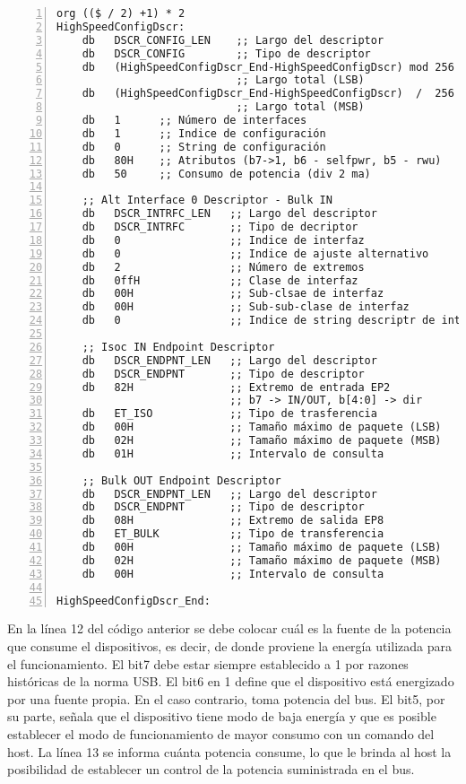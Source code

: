 	\begin{lstlisting}[language={[x86masm]Assembler},backgroundcolor=\color{gray!30},numbers=left]
org (($ / 2) +1) * 2
HighSpeedConfigDscr:
	db   DSCR_CONFIG_LEN	;; Largo del descriptor
	db   DSCR_CONFIG        ;; Tipo de descriptor
	db   (HighSpeedConfigDscr_End-HighSpeedConfigDscr) mod 256
							;; Largo total (LSB)
	db   (HighSpeedConfigDscr_End-HighSpeedConfigDscr)  /  256 
							;; Largo total (MSB)
	db   1      ;; Número de interfaces
	db   1      ;; Indice de configuración
	db   0		;; String de configuración
	db   80H	;; Atributos (b7->1, b6 - selfpwr, b5 - rwu)
	db   50		;; Consumo de potencia (div 2 ma)
	
	;; Alt Interface 0 Descriptor - Bulk IN
	db   DSCR_INTRFC_LEN   ;; Largo del descriptor
	db   DSCR_INTRFC       ;; Tipo de decriptor
	db   0                 ;; Indice de interfaz
	db   0                 ;; Indice de ajuste alternativo
	db   2                 ;; Número de extremos
	db   0ffH              ;; Clase de interfaz
	db   00H               ;; Sub-clsae de interfaz
	db   00H               ;; Sub-sub-clase de interfaz
	db   0                 ;; Indice de string descriptr de interfaz
	
	;; Isoc IN Endpoint Descriptor 
	db   DSCR_ENDPNT_LEN   ;; Largo del descriptor
	db   DSCR_ENDPNT       ;; Tipo de descriptor
	db   82H               ;; Extremo de entrada EP2
						   ;; b7 -> IN/OUT, b[4:0] -> dir
	db   ET_ISO            ;; Tipo de trasferencia
	db   00H               ;; Tamaño máximo de paquete (LSB)
	db   02H               ;; Tamaño máximo de paquete (MSB) 
	db   01H               ;; Intervalo de consulta
	
	;; Bulk OUT Endpoint Descriptor
	db   DSCR_ENDPNT_LEN   ;; Largo del descriptor
	db   DSCR_ENDPNT       ;; Tipo de descriptor
	db   08H               ;; Extremo de salida EP8
	db   ET_BULK           ;; Tipo de transferencia
	db   00H               ;; Tamaño máximo de paquete (LSB)
	db   02H               ;; Tamaño máximo de paquete (MSB)
	db   00H               ;; Intervalo de consulta
	
HighSpeedConfigDscr_End:
	\end{lstlisting}
	
	En la línea 12 del código anterior se debe colocar cuál es la fuente de la potencia que consume el dispositivos, es decir, de donde proviene la energía utilizada para el funcionamiento. El bit7 debe estar siempre establecido a 1 por razones históricas de la norma USB\cite{USBspec}. El bit6 en 1 define que el dispositivo está energizado por una fuente propia. En el caso contrario, toma potencia del bus. El bit5, por su parte, señala que el dispositivo tiene modo de baja energía y que es posible establecer el modo de funcionamiento de mayor consumo con un comando del host. La línea 13 se informa cuánta potencia consume, lo que le brinda al host la posibilidad de establecer un control de la potencia suministrada en el bus.
	
